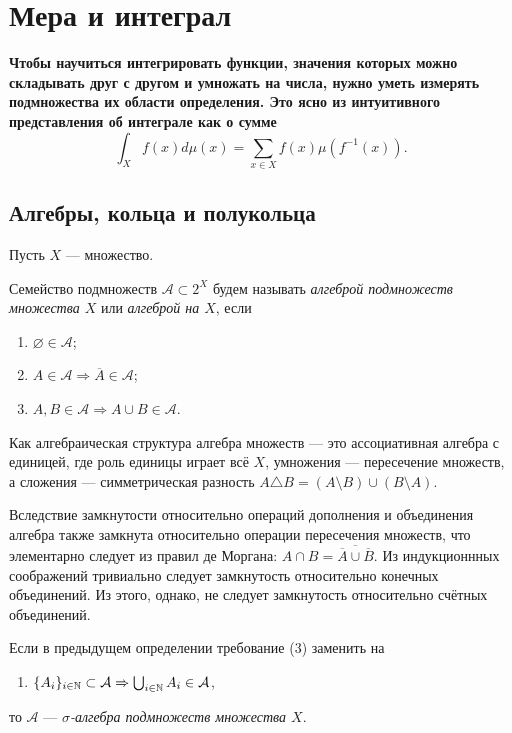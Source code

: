 \section{Мера и интеграл}

{\bf Чтобы научиться интегрировать функции, значения которых можно складывать друг с другом и умножать на числа, нужно уметь измерять подмножества их области определения. Это ясно из интуитивного представления об интеграле как о сумме
\begin{equation*}
	\int_X f(x)d\mu(x)=\sum_{x\in X} f(x)\mu(f^{-1}(x)).
\end{equation*}}

\subsection{Алгебры, кольца и полукольца}
Пусть $X$ --- множество. 
\begin{defin}
	Семейство подмножеств $\mathcal{A}\subset 2^X$ будем называть \textit{алгеброй подмножеств множества $X$} или \textit{алгеброй на $X$}, если
		\begin{enumerate}
			\item $\varnothing\in\mathcal{A}$;
			\item $A\in\mathcal{A}\Rightarrow\overline{A}\in\mathcal{A}$;
			\item $A,B\in\mathcal{A}\Rightarrow A\cup B\in\mathcal{A}$.
		\end{enumerate}
\end{defin}
Как алгебраическая структура алгебра множеств --- это ассоциативная алгебра с единицей, где роль единицы играет всё $X$, умножения --- пересечение множеств, а сложения --- симметрическая разность $A\triangle B=(A\setminus B)\cup(B\setminus A)$.

Вследствие замкнутости относительно операций дополнения и объединения алгебра также замкнута относительно операции пересечения множеств, что элементарно следует из правил де Моргана: $A\cap B=\overline{\overline{A}\cup\overline{B}}$. Из индукционнных соображений тривиально следует замкнутость относительно конечных объединений. Из этого, однако, не следует замкнутость относительно счётных объединений.
\begin{defin}
	Если в предыдущем определении требование (3) заменить на
		\begin{enumerate}
			\item $\{A_i\}_{i\in\mathbb {N}}\subset\mathcal{A}\Rightarrow \bigcup_{i\in\mathbb {N}} A_i\in\mathcal{A}$,
		\end{enumerate}
	то $\mathcal{A}$ --- \textit{$\sigma$-алгебра подмножеств множества $X$}.
\end{defin}

